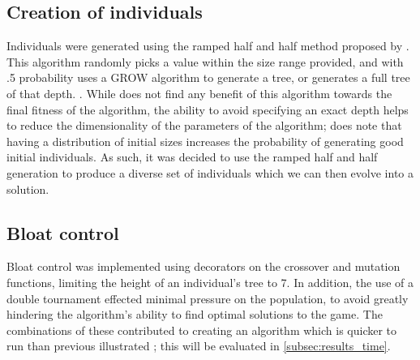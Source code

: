 \documentclass[british,10pt,a4paper]{article}
\begin{document}
\subsection{Creation of individuals}
Individuals were generated using the ramped half and half method proposed by \citet{Koza1992-zm}. This algorithm randomly picks a value within the size range provided, and with .5 probability uses a GROW algorithm to generate a tree, or generates a full tree of that depth. \cite{Luke2001-ix}. While \citet{Luke2001-ix} does not find any benefit of this algorithm towards the final fitness of the algorithm, the ability to avoid specifying an exact depth helps to reduce the dimensionality of the parameters of the algorithm; \citeauthor{Luke2001-ix} does note that having a distribution of initial sizes increases the probability of generating good initial individuals. As such, it was decided to use the ramped half and half generation to produce a diverse set of individuals which we can then evolve into a solution.

\subsection{Bloat control}
Bloat control was implemented using decorators on the crossover and mutation functions, limiting the height of an individual's tree to 7. In addition, the use of a double tournament effected minimal pressure on the population, to avoid greatly hindering the algorithm's ability to find optimal solutions to the game. The combinations of these contributed to creating an algorithm which is quicker to run than previous illustrated \cite{Ehlis2000-sz}; this will be evaluated in \autoref{subsec:results_time}.
\end{document}
